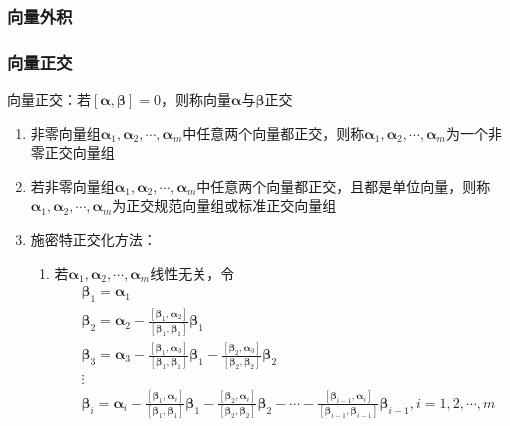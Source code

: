 \documentclass[12pt]{book}
\begin{document}
\subsubsection{向量外积}



\subsubsection{向量正交}

向量正交：若$[\bm{\alpha},\bm{\beta}]=0$，则称向量$\bm{\alpha}$与$\bm{\beta}$正交


\begin{enumerate}[1.]
    \item 非零向量组$\bm{\alpha}_1,\bm{\alpha}_2,\cdots,\bm{\alpha}_m$中任意两个向量都正交，则称$\bm{\alpha}_1,\bm{\alpha}_2,\cdots,\bm{\alpha}_m$为一个非零正交向量组
    \item 若非零向量组$\bm{\alpha}_1,\bm{\alpha}_2,\cdots,\bm{\alpha}_{m}$中任意两个向量都正交，且都是单位向量，则称$\bm{\alpha}_{1},\bm{\alpha}_{2},\cdots,\bm{\alpha}_{m}$为正交规范向量组或标准正交向量组
    \item 施密特正交化方法：
          \begin{enumerate}[(1)]
              \item 若$\bm{\alpha}_{1},\bm{\alpha}_{2},\cdots,\bm{\alpha}_{m}$线性无关，令
                    \begin{align*}
                        &\bm{\beta}_1 = \bm{\alpha}_1                                                                                                                                                                        \\
                        &\bm{\beta}_2 = \bm{\alpha}_2 - \frac{[\bm{\beta}_{1},\bm{\alpha}_2]}{[\bm{\beta}_1,\bm{\beta}_1]}\bm{\beta}_{1}                                                                                     \\
                        &\bm{\beta}_3 = \bm{\alpha}_3 - \frac{[\bm{\beta}_{1},\bm{\alpha}_3]}{[\bm{\beta}_1,\bm{\beta}_1]}\bm{\beta}_{1} -  \frac{[\bm{\beta}_{2},\bm{\alpha}_3]}{[\bm{\beta}_2,\bm{\beta}_2]}\bm{\beta}_{2} \\
                        &\vdots                                                                                                                                                                                              \\
                        &\bm{\beta}_i = \bm{\alpha}_i - \frac{[\bm{\beta}_{1},\bm{\alpha}_i]}{[\bm{\beta}_1,\bm{\beta}_1]}\bm{\beta}_{1} -  \frac{[\bm{\beta}_{2},\bm{\alpha}_i]}{[\bm{\beta}_2,\bm{\beta}_2]}\bm{\beta}_{2} - \cdots - \frac{[\bm{\beta}_{i-1},\bm{\alpha}_i]}{[\bm{\beta}_{i-1},\bm{\beta}_{i-1}]}\bm{\beta}_{i-1} , i=1,2,\cdots,m

\end{align*}
\end{enumerate}
\end{enumerate}
\end{document}
